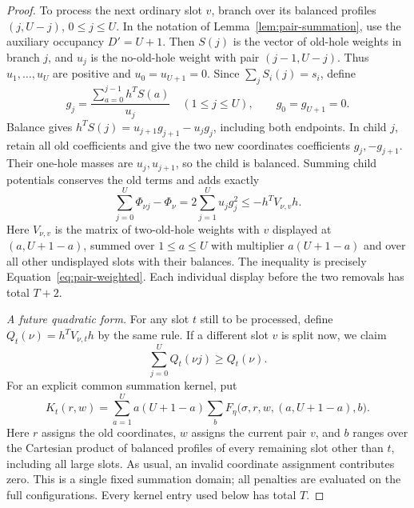 \begin{proof}
To process the next ordinary slot $v$, branch over its balanced profiles
$(j,U-j)$, $0\le j\le U$.  In the notation of
Lemma~\ref{lem:pair-summation}, use the auxiliary occupancy $D'=U+1$.
Then $S(j)$ is the vector of old-hole weights in branch $j$, and $u_j$
is the no-old-hole weight with pair $(j-1,U-j)$.  Thus $u_1,\ldots,u_U$
are positive and $u_0=u_{U+1}=0$.  Since $\sum_j S_i(j)=s_i$, define
\begin{equation}\label{eq:transport-g}
 g_j=\frac{\sum_{a=0}^{j-1}h^T S(a)}{u_j}\quad(1\le j\le U),
 \qquad g_0=g_{U+1}=0.
\end{equation}
Balance gives $h^TS(j)=u_{j+1}g_{j+1}-u_jg_j$, including both endpoints.
In child $j$, retain all old coefficients and give the two new
coordinates coefficients $g_j,-g_{j+1}$.  Their one-hole masses are
$u_j,u_{j+1}$, so the child is balanced.  Summing child potentials
conserves the old terms and adds exactly
\begin{equation}\label{eq:potential-increment}
 \sum_{j=0}^U\Phi_{\nu j}-\Phi_\nu
 =2\sum_{j=1}^Uu_jg_j^2
 \le -h^TV_{\nu,v}h.
\end{equation}
Here $V_{\nu,v}$ is the matrix of two-old-hole weights with $v$ displayed
at $(a,U+1-a)$, summed over $1\le a\le U$ with multiplier
$a(U+1-a)$ and over all other undisplayed slots with their balances.
The inequality is precisely Equation~\eqref{eq:pair-weighted}.
Each individual display before the two removals has total $T+2$.

\emph{A future quadratic form.}
For any slot $t$ still to be processed, define
$Q_t(\nu)=h^TV_{\nu,t}h$ by the same rule.  If a different slot $v$ is
split now, we claim
\begin{equation}\label{eq:future-monotonicity}
 \sum_{j=0}^U Q_t(\nu j)\ge Q_t(\nu).
\end{equation}
For an explicit common summation kernel, put
\[
 K_t(r,w)=\sum_{a=1}^U a(U+1-a)
       \sum_{b}F_\eta\bigl(\sigma,r,w,(a,U+1-a),b\bigr).
\]
Here $r$ assigns the old coordinates, $w$ assigns the current pair $v$,
and $b$ ranges over the Cartesian product of balanced profiles of every
remaining slot other than $t$, including all large slots.
As usual, an invalid coordinate assignment contributes zero.  This is
a single fixed summation domain; all penalties are evaluated on the
full configurations.  Every kernel entry used below has total $T$.


\end{proof}
